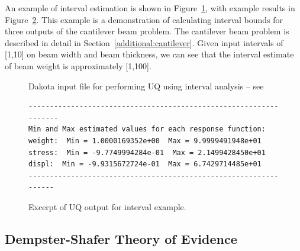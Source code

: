An example of interval estimation 
is shown in Figure~\ref{uq:examples:interval_input}, with example results in 
Figure~\ref{uq:examples:interval_out}. This example is a demonstration 
of calculating interval bounds for three outputs of the cantilever beam 
problem. The cantilever beam problem is described in detail in 
Section~\ref{additional:cantilever}. Given input intervals of [1,10] on 
beam width and beam thickness, we can see that the interval estimate of 
beam weight is approximately [1,100].

\begin{figure}[htbp!]
  \centering
  \begin{bigbox}
    \begin{small}
    \end{small}
  \end{bigbox}
\caption{Dakota input file for performing UQ using interval analysis --
see \protect{} }
\label{uq:examples:interval_input}
\end{figure}

\begin{figure}[htbp!]
\centering
\begin{bigbox}
\begin{small}
\begin{verbatim}
------------------------------------------------------------------
Min and Max estimated values for each response function:
weight:  Min = 1.0000169352e+00  Max = 9.9999491948e+01
stress:  Min = -9.7749994284e-01  Max = 2.1499428450e+01
displ:  Min = -9.9315672724e-01  Max = 6.7429714485e+01
-----------------------------------------------------------------
\end{verbatim}
\end{small}
\end{bigbox}
\caption{Excerpt of UQ output for interval example.}
\label{uq:examples:interval_out}
\end{figure}


\subsection{Dempster-Shafer Theory of Evidence}\label{uq:dempshaf}

